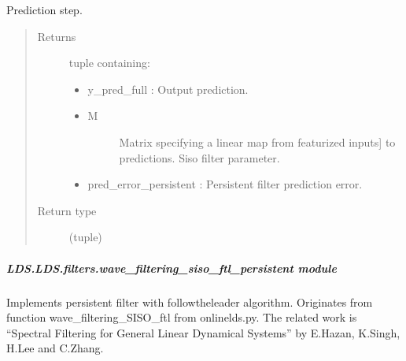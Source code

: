 \documentclass[letterpaper,10pt,english]{sphinxmanual}
\begin{document}
\begin{fulllineitems}
\begin{fulllineitems}
\label{\detokenize{LDS.LDS.filters:LDS.LDS.filters.wave_filtering_siso_ftl.WaveFilteringSisoFtl.predict}}
\sphinxAtStartPar
Prediction step.
\begin{quote}\begin{description}
\item[{Returns}] \leavevmode
\sphinxAtStartPar

\sphinxAtStartPar
tuple containing:
\begin{itemize}
\item {} 
\sphinxAtStartPar
y\_pred\_full           : Output prediction.

\item {} \begin{description}
\item[{M}] \leavevmode{[}Matrix specifying a linear map from featurized inputs{]}
\sphinxAtStartPar
to predictions. Siso filter parameter.

\end{description}

\item {} 
\sphinxAtStartPar
pred\_error\_persistent : Persistent filter prediction error.

\end{itemize}


\item[{Return type}] \leavevmode
\sphinxAtStartPar
(tuple)

\end{description}\end{quote}

\end{fulllineitems}


\end{fulllineitems}



\subparagraph{LDS.LDS.filters.wave\_filtering\_siso\_ftl\_persistent module}
\label{\detokenize{LDS.LDS.filters:module-LDS.LDS.filters.wave_filtering_siso_ftl_persistent}}\label{\detokenize{LDS.LDS.filters:lds-lds-filters-wave-filtering-siso-ftl-persistent-module}}
\sphinxAtStartPar
Implements persistent filter with follow\sphinxhyphen{}the\sphinxhyphen{}leader algorithm.
Originates from function wave\_filtering\_SISO\_ftl from onlinelds.py.
The related work is “Spectral Filtering for General Linear Dynamical Systems”
by E.Hazan, K.Singh, H.Lee and C.Zhang.
\end{document}
